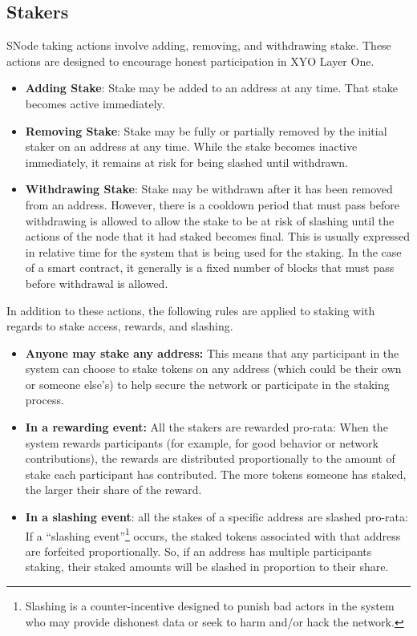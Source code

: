 \documentclass{article}
\begin{document}
\subsection{Stakers}
SNode taking actions involve adding, removing, and withdrawing stake. These actions
are designed to encourage honest participation in XYO Layer One.
\begin{itemize}
    \item \textbf{Adding Stake}: Stake may be added to an address at any time. That stake becomes active immediately.
    \item \textbf{Removing Stake}: Stake may be fully or partially removed by the initial staker on an address at any time. While the stake becomes inactive immediately, it remains at risk for being slashed until withdrawn.
    \item \textbf{Withdrawing Stake}: Stake may be withdrawn after it has been removed from an address. However, there is a cooldown period that must pass before withdrawing is allowed to allow the stake to be at risk of slashing until the actions of the node that it had staked becomes final. This is usually expressed in relative time for the system that is being used for the staking. In the case of a smart contract, it generally is a fixed number of blocks that must pass before withdrawal is allowed.
\end{itemize}
In addition to these actions, the following rules are applied to staking with regards to stake access, rewards, and slashing.
\begin{itemize}
    \item \textbf{Anyone may stake any address:} This means that any participant in the system can choose to stake tokens on any address (which could be their own or someone else’s) to help secure the network or participate in the staking process.
    \item \textbf{In a rewarding event:} All the stakers are rewarded pro-rata: When the system rewards participants (for example, for good behavior or network contributions), the rewards are distributed proportionally to the amount of stake each participant has contributed. The more tokens someone has staked, the larger their share of the reward.
    \item \textbf{In a slashing event}: all the stakes of a specific address are slashed pro-rata: If a “slashing event”\footnote{Slashing is a counter-incentive designed to punish bad actors in the system who may provide dishonest data or seek to harm and/or hack the network.} occurs, the staked tokens associated with that address are forfeited proportionally. So, if an address has multiple participants staking, their staked amounts will be slashed in proportion to their share.
\end{itemize}
\end{document}
